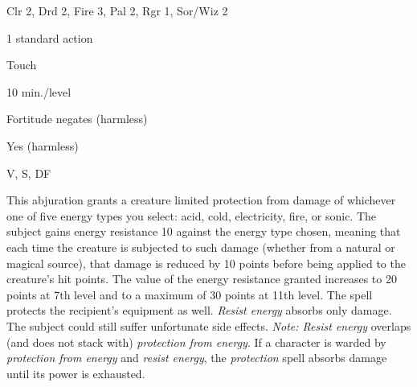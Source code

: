 
\begin{description*}
\item[Level:] Clr 2, Drd 2, Fire 3, Pal 2, Rgr 1, Sor/Wiz 2
\item[Casting Time:] 1 standard action
\item[Range:] Touch
\item[Duration:] 10 min./level
\item[Saving Throw:] Fortitude negates (harmless)
\item[Spell Resistance:] Yes (harmless)
\item[Components:] V, S, DF
\end{description*}

This abjuration grants a creature limited protection from damage of whichever one
of five energy types you select: acid, cold, electricity, fire, or sonic. The subject
gains energy resistance 10 against the energy type chosen, meaning that each time
the creature is subjected to such damage (whether from a natural or magical source),
that damage is reduced by 10 points before being applied to the creature's hit
points. The value of the energy resistance granted increases to 20 points at 7th
level and to a maximum of 30 points at 11th level. The spell protects the recipient's
equipment as well.
\textit{Resist energy} absorbs only damage. The subject could still suffer unfortunate
side effects.
\textit{Note: Resist energy} overlaps (and does not stack with) \textit{protection
from energy}. If a character is warded by \textit{protection from energy} and \textit{resist
energy}, the \textit{protection} spell absorbs damage until its power is exhausted.
